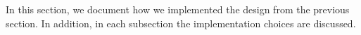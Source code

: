 
In this section, we document how we implemented the design from the previous section. In addition, in each subsection the implementation choices are discussed. 